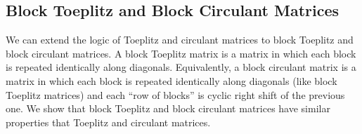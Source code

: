 






\subsection{Block Toeplitz and Block Circulant Matrices}
\label{subsection:ch2-block_toeplitz_and_block_circulant_matrices}

We can extend the logic of Toeplitz and circulant matrices to block Toeplitz and block circulant matrices.
A block Toeplitz matrix is a matrix in which each block is repeated identically along diagonals.
Equivalently, a block circulant matrix is a matrix in which each block is repeated identically along diagonals (like block Toeplitz matrices) and each ``row of blocks'' is cyclic right shift of the previous one.
We show that block Toeplitz and block circulant matrices have similar properties that Toeplitz and circulant matrices.


